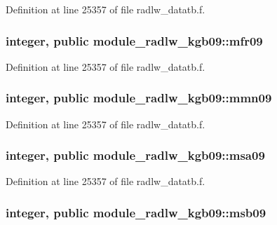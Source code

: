 Definition at line 25357 of file radlw\+\_\+datatb.\+f.

\subsubsection[{\texorpdfstring{mfr09}{mfr09}}]{\setlength{\rightskip}{0pt plus 5cm}integer, public module\+\_\+radlw\+\_\+kgb09\+::mfr09}\hypertarget{namespacemodule__radlw__kgb09_a777f63022c4f7187446945c6e6ba77e7}{}\label{namespacemodule__radlw__kgb09_a777f63022c4f7187446945c6e6ba77e7}


Definition at line 25357 of file radlw\+\_\+datatb.\+f.

\subsubsection[{\texorpdfstring{mmn09}{mmn09}}]{\setlength{\rightskip}{0pt plus 5cm}integer, public module\+\_\+radlw\+\_\+kgb09\+::mmn09}\hypertarget{namespacemodule__radlw__kgb09_aa9c8294b56ac3ce90b07114e986777a9}{}\label{namespacemodule__radlw__kgb09_aa9c8294b56ac3ce90b07114e986777a9}


Definition at line 25357 of file radlw\+\_\+datatb.\+f.

\subsubsection[{\texorpdfstring{msa09}{msa09}}]{\setlength{\rightskip}{0pt plus 5cm}integer, public module\+\_\+radlw\+\_\+kgb09\+::msa09}\hypertarget{namespacemodule__radlw__kgb09_ab739f0acab23f3140067506b396b3717}{}\label{namespacemodule__radlw__kgb09_ab739f0acab23f3140067506b396b3717}


Definition at line 25357 of file radlw\+\_\+datatb.\+f.

\subsubsection[{\texorpdfstring{msb09}{msb09}}]{\setlength{\rightskip}{0pt plus 5cm}integer, public module\+\_\+radlw\+\_\+kgb09\+::msb09}\hypertarget{namespacemodule__radlw__kgb09_a7e6bb7acb0df29586d0bd52f3fc41d90}{}\label{namespacemodule__radlw__kgb09_a7e6bb7acb0df29586d0bd52f3fc41d90}


